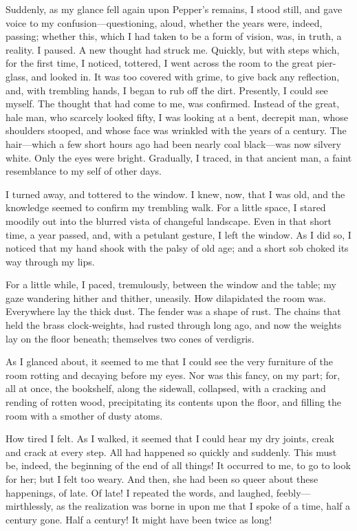 Suddenly, as my glance fell again upon Pepper’s remains, I stood still, and gave voice to my confusion---questioning, aloud, whether the years were, indeed, passing; whether this, which I had taken to be a form of vision, was, in truth, a reality. I paused. A new thought had struck me. Quickly, but with steps which, for the first time, I noticed, tottered, I went across the room to the great pier-glass, and looked in. It was too covered with grime, to give back any reflection, and, with trembling hands, I began to rub off the dirt. Presently, I could see myself. The thought that had come to me, was confirmed. Instead of the great, hale man, who scarcely looked fifty, I was looking at a bent, decrepit man, whose shoulders stooped, and whose face was wrinkled with the years of a century. The hair---which a few short hours ago had been nearly coal black---was now silvery white. Only the eyes were bright. Gradually, I traced, in that ancient man, a faint resemblance to my self of other days.

I turned away, and tottered to the window. I knew, now, that I was old, and the knowledge seemed to confirm my trembling walk. For a little space, I stared moodily out into the blurred vista of changeful landscape. Even in that short time, a year passed, and, with a petulant gesture, I left the window. As I did so, I noticed that my hand shook with the palsy of old age; and a short sob choked its way through my lips.

For a little while, I paced, tremulously, between the window and the table; my gaze wandering hither and thither, uneasily. How dilapidated the room was. Everywhere lay the thick dust. The fender was a shape of rust. The chains that held the brass clock-weights, had rusted through long ago, and now the weights lay on the floor beneath; themselves two cones of verdigris.

As I glanced about, it seemed to me that I could see the very furniture of the room rotting and decaying before my eyes. Nor was this fancy, on my part; for, all at once, the bookshelf, along the sidewall, collapsed, with a cracking and rending of rotten wood, precipitating its contents upon the floor, and filling the room with a smother of dusty atoms.

How tired I felt. As I walked, it seemed that I could hear my dry joints, creak and crack at every step. All had happened so quickly and suddenly. This must be, indeed, the beginning of the end of all things! It occurred to me, to go to look for her; but I felt too weary. And then, she had been so queer about these happenings, of late. Of late! I repeated the words, and laughed, feebly---mirthlessly, as the realization was borne in upon me that I spoke of a time, half a century gone. Half a century! It might have been twice as long!

